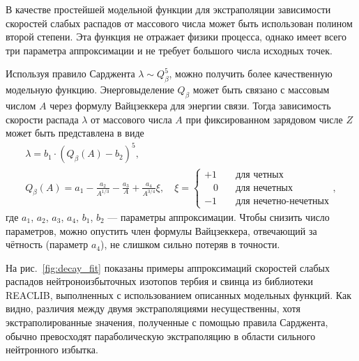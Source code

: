   В качестве простейшей модельной функции для экстраполяции зависимости скоростей слабых распадов от массового числа может быть использован полином второй степени. Эта функция не отражает физики процесса, однако имеет всего три параметра аппроксимации и не требует большого числа исходных точек. 

  Используя правило Сарджента $\lambda \sim Q_\beta^5$, можно получить более качественную модельную функцию. Энерговыделение $Q_\beta$ может быть связано с массовым числом $A$ через формулу Вайцзеккера для энергии связи. Тогда зависимость скорости распада $\lambda$ от массового числа $A$ при фиксированном зарядовом числе $Z$ может быть представлена в виде
\begin{equation}
\begin{gathered}
  \displaystyle
  \lambda = b_1 \cdot (Q_\beta(A) - b_2)^5,\\
  Q_\beta(A) = 
  a_1 - \frac{a_2}{A^{1/3}} - \frac{a_3}{A} + \frac{a_4}{A^{3/4}} \xi,
  \quad \xi =
  \begin{cases}
    +1& \quad\text{для четных} \\
    \hspace{11pt}0& \quad\text{для нечетных} \\
    -1& \quad\text{для нечетно-нечетных}
  \end{cases},
\end{gathered}
\end{equation}
где $a_1$, $a_2$, $a_3$, $a_4$, $b_1$, $b_2$ --- параметры аппроксимации. Чтобы снизить число параметров, можно опустить член формулы Вайцзеккера, отвечающий за чётность (параметр $a_4$), не слишком сильно потеряв в точности.

  На рис.~\ref{fig:decay_fit} показаны примеры аппроксимаций скоростей слабых распадов нейтроноизбыточных изотопов тербия и свинца из библиотеки REACLIB, выполненных с использованием описанных модельных функций. Как видно, различия между двумя экстраполяциями несущественны, хотя экстраполированные значения, полученные с помощью правила Сарджента, обычно превосходят параболическую экстраполяцию в области сильного нейтронного избытка.
  
